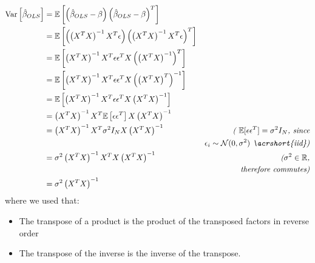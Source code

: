 \documentclass[12pt]{article}
\begin{document}
\begin{align*}
    \var\left[\betols\right]
     & = \E\left[ \left(\betols - \beta\right) \left(\betols - \beta\right)^T \right]                                                                                                                     \\
     & = \E\left[ \left(\left( X^T X \right)^{-1}X^T \epsilon\right) \left(\left( X^T X \right)^{-1}X^T \epsilon\right)^T \right]                                                                         \\
     & = \E\left[ \left( X^T X \right)^{-1}X^T \epsilon \epsilon^T X \left(\left( X^T X \right)^{-1}\right)^{T} \right]                                                                                   \\
     & = \E\left[ \left( X^T X \right)^{-1}X^T \epsilon \epsilon^T X \left(\left( X^T X \right)^{T}\right)^{-1} \right]                                                                                   \\
     & = \E\left[ \left( X^T X \right)^{-1}X^T \epsilon \epsilon^T X \left(X^T X \right)^{-1} \right]                                                                                                     \\
     & = \left( X^T X \right)^{-1}X^T \E\left[\epsilon \epsilon^T \right] X \left(X^T X \right)^{-1}                                                                                                      \\
     & = \left( X^T X \right)^{-1}X^T \sigma^2 I_N X \left(X^T X \right)^{-1}                                                     & \textit{( \(\E[\epsilon\epsilon^T] = \sigma^2 I_N\), since}            \\
     &                                                                                                                            & \textit{\(\epsilon_i \sim \mathcal{N}(0, \sigma^2)\) \acrshort{iid})} \\
     & = \sigma^2 \left( X^T X \right)^{-1}X^T X \left(X^T X \right)^{-1}                                                         & \textit{(\(\sigma^2 \in \R\),}                                        \\
     &                                                                                                                            & \textit{therefore commutes)}                                          \\
     & = \sigma^2 \left( X^T X \right)^{-1}                                                                                                                                                               \\
\end{align*}
where we used that:
\begin{itemize}
    \item The transpose of a product is the product of the transposed factors in reverse order
    \item The transpose of the inverse is the inverse of the transpose.
\end{itemize}


\clearpage

\end{document}
